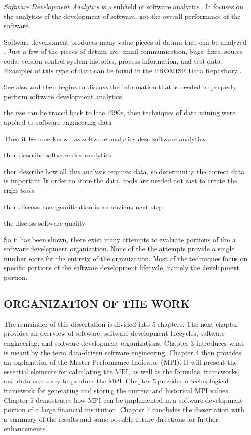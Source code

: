\documentclass[SDSUThesis.tex]{subfiles}
\begin{document}
\textit{Software Development Analytics} is a subfield of software analytics 
\cite{Menzies2012}.  It focuses on the analytics of the development of software, not
the overall performance of the software.  

Software development produces many value pieces of datum that can be analyzed
\cite{Marcus2010}. Just a few of the pieces of datum are:
email communication, bugs, fixes, source code, version control system histories,
process information, and test data.  Examples of this type of data
can be found in the PROMISE Data Repository \cite{promise12}.

See also \cite{Buse2010} and then \cite{Buse2012} begins to discuss the 
information that is needed to properly perform software development analytics.

the use can be traced back to late 1990s, then techniques of data mining were applied to 
software engineering data

Then it became known as software analytics
desc software analytics

then describe software dev analytics

then describe how all this analysis requires data, so determining the correct data is important \cite{Buse2012}
In order to store the data, tools are needed \cite{Czerwonka2013,Zhang2013} not east to create the right tools \cite{Spraragen2005}

then discuss how gamification is an obvious next step \cite{Dubois2013, Jain2013}

the discuss software quality \cite{Jones2013,Boehm2001,Faizan2012,Miguel2014}




    
    So it has been shown, there exist many attempts to 
    evaluate portions of the a software development 
    organization.  None of the the attempts provide
    a single number score for the entirety of the 
    organization.  Most of the techniques focus on
    specific portions of the software development 
    lifecycle, namely the development portion. 

\subsection{ORGANIZATION OF THE WORK}

The remainder of this dissertation is divided into 5 chapters.  The next chapter provides
an overview of software, software development lifecycles, software engineering, and software
development organizations.  Chapter 3 introduces what is meant by the term data-driven
software engineering. Chapter 4 then provides an explanation of the Master Performance 
Indicator (MPI).  It will present the essential elements for calculating the MPI, as well
as the formulas, frameworks, and data necessary to produce the MPI. Chapter 5 provides
a technological framework for generating and storing the current and historical MPI values.
Chapter 6 demostrates how MPI can be implemented in a software development portion of 
a large financial institution.  Chapter 7 concludes the dissertation with a summary
of the results and some possible future directions for further enhancements. 
\end{document}
